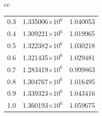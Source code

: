 \begin{table}[hbtp]
\begin{tabular}{cc}
\begin{tabular}{lrr}
 0.3 & 1.335006$\times 10^{6}$ & 1.040053 \\
 0.4 & 1.309221$\times 10^{6}$ & 1.019965 \\
 0.5 & 1.322382$\times 10^{6}$ & 1.030218 \\
 0.6 & 1.321435$\times 10^{6}$ & 1.029481 \\
 0.7 & 1.283419$\times 10^{6}$ & 0.999863 \\
 0.8 & 1.304767$\times 10^{6}$ & 1.016495 \\
 0.9 & 1.339323$\times 10^{6}$ & 1.043416 \\
 1.0 & 1.360193$\times 10^{6}$ & 1.059675 \\
\bottomrule
\end{tabular}
  \end{tabular}

  \label{tab:pwr_inf_flx}
\end{table}
